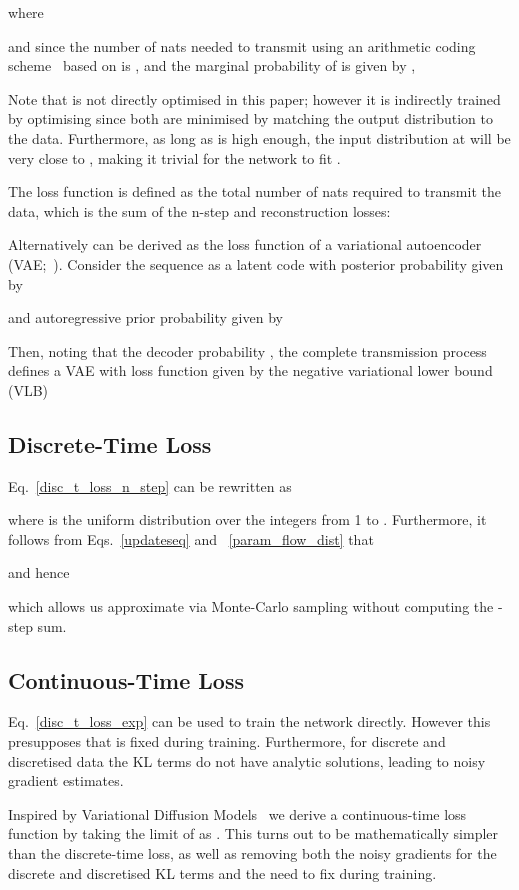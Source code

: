 \documentclass[11pt,table]{article}
\newcommand{\0}[1]{\constvec{0}{#1}}
\newcommand{\1}[1]{\constvec{1}{#1}}
\begin{document}
where

and since the number of nats needed to transmit  using an arithmetic coding scheme~\citep{witten1987arithmetic} based on  is , and the marginal probability of  is given by ,

Note that  is not directly optimised in this paper; however it is indirectly trained by optimising  since both are minimised by matching the output distribution to the data.
Furthermore, as long as  is high enough, the input distribution at  will be very close to , making it trivial for the network to fit .

The loss function  is defined as the total number of nats required to transmit the data, which is the sum of the n-step and reconstruction losses:

Alternatively   can be derived as the loss function of a variational autoencoder (VAE;~\citep{kingma2013auto}). Consider the sequence  as a latent code with posterior probability given by

and autoregressive prior probability given by

Then, noting that the decoder probability , the complete transmission process defines a VAE with loss function given by the negative variational lower bound (VLB)

\subsection{Discrete-Time Loss \texorpdfstring{}{}}
Eq.~\ref{disc_t_loss_n_step} can be rewritten as

where  is the uniform distribution over the integers from 1 to .
Furthermore, it follows from Eqs.~\ref{updateseq} and ~\ref{param_flow_dist} that

and hence

which allows us approximate  via Monte-Carlo sampling without computing the -step sum.
\subsection{Continuous-Time Loss \texorpdfstring{}{}}
Eq.~\ref{disc_t_loss_exp} can be used to train the network directly.
However this presupposes that  is fixed during training.
Furthermore, for discrete and discretised data the KL terms do not have analytic solutions, leading to noisy gradient estimates.

Inspired by Variational Diffusion Models~\cite{kingma2021variational} we derive a continuous-time loss function  by taking the limit of  as .
This turns out to be mathematically simpler than the discrete-time loss, as well as removing both the noisy gradients for the discrete and discretised KL terms and the need to fix  during training.
\end{document}

